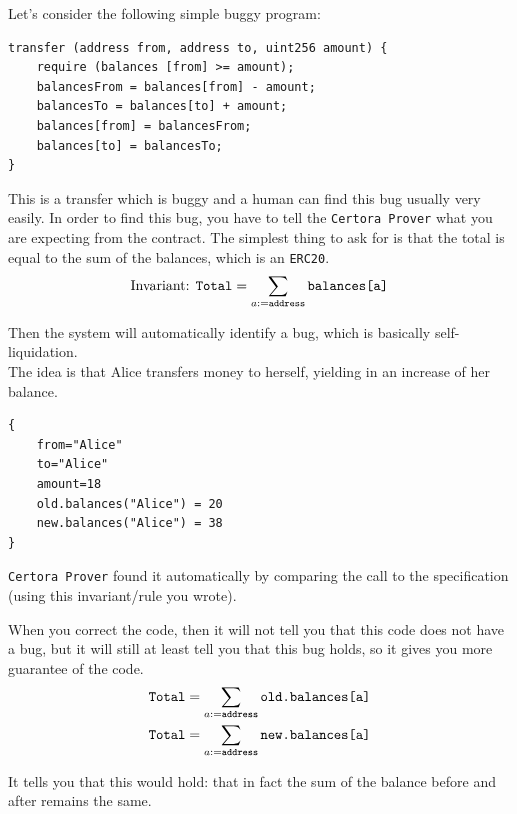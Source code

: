 \documentclass[oneside]{book}
\begin{document}
    Let's consider the following simple buggy program:

    \begin{lstlisting}[language=Solidity, style=SolStyle]
transfer (address from, address to, uint256 amount) {
    require (balances [from] >= amount);
    balancesFrom = balances[from] - amount;
    balancesTo = balances[to] + amount;
    balances[from] = balancesFrom;
    balances[to] = balancesTo;
}
\end{lstlisting}

    This is a transfer which is buggy and a human can find this bug usually very easily.
    In order to find this bug, you have to tell the \texttt{Certora Prover} what you are expecting from the contract.
    The simplest thing to ask for is that the total is equal to the sum of the balances, which is an \texttt{ERC20}.\\

   $$
   \text{Invariant:  \texttt{Total}}=\sum_{a:=\text{\texttt{address}}}\text{\texttt{balances[a]}}
   $$

    Then the system will automatically identify a bug, which is basically self-liquidation.\\

    The idea is that Alice transfers money to herself, yielding in an increase of her balance.

    \begin{lstlisting}[language=Solidity, style=SolStyle]
{
    from="Alice"
    to="Alice"
    amount=18
    old.balances("Alice") = 20
    new.balances("Alice") = 38
}
\end{lstlisting}

    \texttt{Certora Prover} found it automatically by comparing the call to the specification (using this invariant/rule you wrote).

    When you correct the code, then it will not tell you that this code does not have a bug, but it will still at least tell you that this bug holds, so it gives you more guarantee of the code.\\

    \begin{align*}
        &\text{\texttt{Total}}=\sum_{a:=\text{\texttt{address}}}\text{\texttt{old.balances[a]}}\\
        &\text{\texttt{Total}}=\sum_{a:=\text{\texttt{address}}}\text{\texttt{new.balances[a]}}
    \end{align*}

    It tells you that this would hold: that in fact the sum of the balance before and after remains the same.\\
\end{document}
